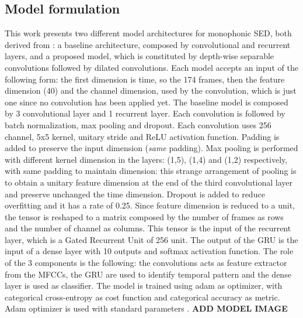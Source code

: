 \documentclass{article}
\begin{document}
\subsection{Model formulation}
\label{subsec:mono_model}

This work presents two different model architectures for monophonic SED, both derived from \cite{drossos2020sound}: a baseline architecture, composed by convolutional and recurrent layers, and a proposed model, which is constituted by depth-wise separable convolutions followed by dilated convolutions.\newline
Each model accepts an input of the following form: the first dimension is time, so the 174 frames, then the feature dimension (40) and the channel dimension, used by the convolution, which is just one since no convolution has been applied yet.\newline
The baseline model is composed by 3 convolutional layer and 1 recurrent layer. Each convolution is followed by batch normalization, max pooling and dropout. Each convolution uses 256 channel, 5x5 kernel, unitary stride and ReLU activation function. Padding is added to preserve the input dimension (\textit{same} padding). Max pooling is performed with different kernel dimension in the layers: (1,5), (1,4) and (1,2) respectively, with same padding to maintain dimension: this strange arrangement of pooling is to obtain a unitary feature dimension at the end of the third convolutional layer and preserve unchanged the time dimension. Dropout is added to reduce overfitting and it has a rate of 0.25. Since feature dimension is reduced to a unit, the tensor is reshaped to a matrix composed by the number of frames as rows and the number of channel as columns. This tensor is the input of the recurrent layer, which is a Gated Recurrent Unit of 256 unit. The output of the GRU is the input of a dense layer with 10 outputs and softmax activation function. The role of the 3 components is the following: the convolutions acts as feature extractor from the MFCCs, the GRU are used to identify temporal pattern and the dense layer is used as classifier. The model is trained using adam as optimizer, with categorical cross-entropy as cost function and categorical accuracy as metric. Adam optimizer is used with standard parameters \cite{kingma2017adam}.\newline
\textbf{ADD MODEL IMAGE}
\newline
\end{document}
